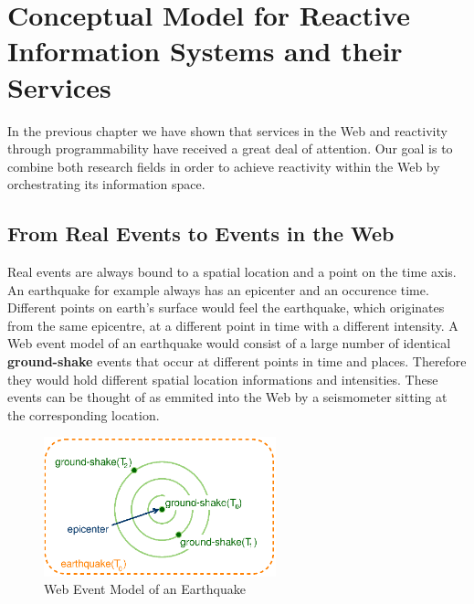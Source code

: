 
\chapter{Conceptual Model for Reactive Information Systems and their Services}




%


In the previous chapter we have shown that services in the Web and reactivity through programmability have received a great deal of attention.
Our goal is to combine both research fields in order to achieve reactivity within the Web by orchestrating its information space. 

\section{From Real Events to Events in the Web}
Real events are always bound to a spatial location and a point on the time axis.
An earthquake for example always has an epicenter and an occurence time.
Different points on earth's surface would feel the earthquake, which originates from the same epicentre, at a different point in time with a different intensity.
A Web event model of an earthquake would consist of a large number of identical \textrm{\textbf{ground-shake}} events that occur at different points in time and places.
Therefore they would hold different spatial location informations and intensities.
These events can be thought of as emmited into the Web by a seismometer sitting at the corresponding location.
\begin{figure}[!ht]
  \centering
  \includegraphics[width=0.6\textwidth]{figures/Earthquake}
  \caption{Web Event Model of an Earthquake}
  \label{fig:Earthquake}
\end{figure}

